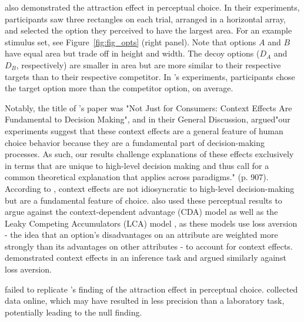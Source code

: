 \textcite{trueblood2013not} also demonstrated the attraction effect in perceptual choice. In their experiments, participants saw three rectangles on each trial, arranged in a horizontal array, and selected the option they perceived to have the largest area. For an example stimulus set, see Figure~\ref{fig:fig_opts} (right panel). Note that options $A$ and $B$ have equal area but trade off in height and width. The decoy options ($D_{A}$ and $D_{B}$, respectively) are smaller in area but are more similar to their respective targets than to their respective competitor. In \textcite{trueblood2013not}'s experiments, participants chose the target option more than the competitor option, on average. 

Notably, the title of \textcite{trueblood2013not}'s paper was "Not Just for Consumers: Context Effects Are Fundamental to Decision Making", and in their General Discussion, \textcite{trueblood2013not} argued"our experiments suggest that these context effects are a general feature of human choice behavior because they are a fundamental part of decision-making processes. As such, our results challenge explanations of these effects exclusively in terms that are unique to high-level decision making and thus call for a common theoretical explanation that applies across paradigms." (p. 907). According to \textcite{trueblood2013not}, context effects are not idiosyncratic to high-level decision-making but are a fundamental feature of choice. \textcite{trueblood2013not} also used these perceptual results to argue against the context-dependent advantage (CDA) model \parencite{tversky1993context} as well as the Leaky Competing Accumulators (LCA) model \parencite{usherLossAversionInhibition2004a}, as these models use loss aversion  - the idea that an option's disadvantages on an attribute are weighted more strongly than its advantages on other attributes - to account for context effects. \textcite{truebloodMultialternativeContextEffects2012} demonstrated context effects in an inference task and argued similarly against loss aversion.

\textcite{frederickLimitsAttraction2014b} failed to replicate \textcite{trueblood2013not}'s finding of the attraction effect in perceptual choice. \textcite{frederickLimitsAttraction2014b} collected data online, which may have resulted in less precision than a laboratory task, potentially leading to the null finding.

